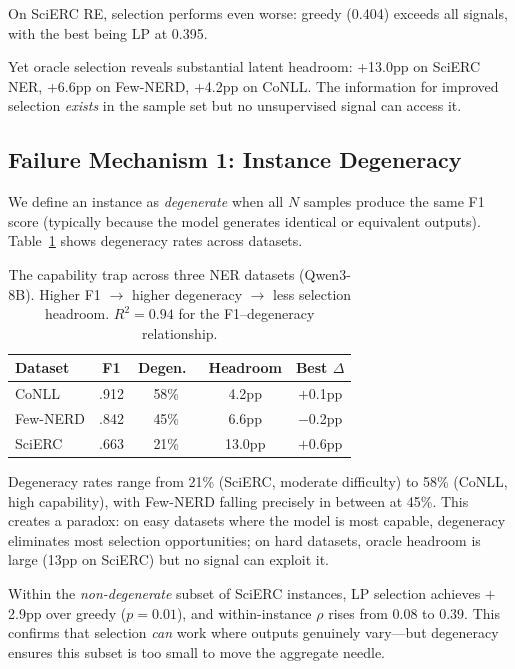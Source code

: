 \documentclass[11pt,twocolumn]{article}
\begin{document}
On SciERC RE, selection performs even worse: greedy (0.404) exceeds all signals, with the best being LP at 0.395.

Yet oracle selection reveals substantial latent headroom: +13.0pp on SciERC NER, +6.6pp on Few-NERD, +4.2pp on CoNLL.
The information for improved selection \emph{exists} in the sample set but no unsupervised signal can access it.

\subsection{Failure Mechanism 1: Instance Degeneracy}
\label{sec:degeneracy}

We define an instance as \emph{degenerate} when all $N$ samples produce the same F1 score (typically because the model generates identical or equivalent outputs).
Table~\ref{tab:trap} shows degeneracy rates across datasets.

\begin{table}[t]
\centering
\small
\caption{The capability trap across three NER datasets (Qwen3-8B). Higher F1 $\rightarrow$ higher degeneracy $\rightarrow$ less selection headroom. $R^2{=}0.94$ for the F1--degeneracy relationship.}
\label{tab:trap}
\begin{tabular}{@{}l cccc@{}}
\toprule
Dataset & F1 & Degen.\ & Headroom & Best $\Delta$ \\
\midrule
CoNLL   & .912 & 58\% & 4.2pp & $+$0.1pp \\
Few-NERD & .842 & 45\% & 6.6pp & $-$0.2pp \\
SciERC  & .663 & 21\% & 13.0pp & $+$0.6pp \\
\bottomrule
\end{tabular}
\end{table}

Degeneracy rates range from 21\% (SciERC, moderate difficulty) to 58\% (CoNLL, high capability), with Few-NERD falling precisely in between at 45\%.
This creates a paradox: on easy datasets where the model is most capable, degeneracy eliminates most selection opportunities; on hard datasets, oracle headroom is large (13pp on SciERC) but no signal can exploit it.

Within the \emph{non-degenerate} subset of SciERC instances, LP selection achieves $+$2.9pp over greedy ($p{=}0.01$), and within-instance $\rho$ rises from 0.08 to 0.39.
This confirms that selection \emph{can} work where outputs genuinely vary---but degeneracy ensures this subset is too small to move the aggregate needle.
\end{document}
